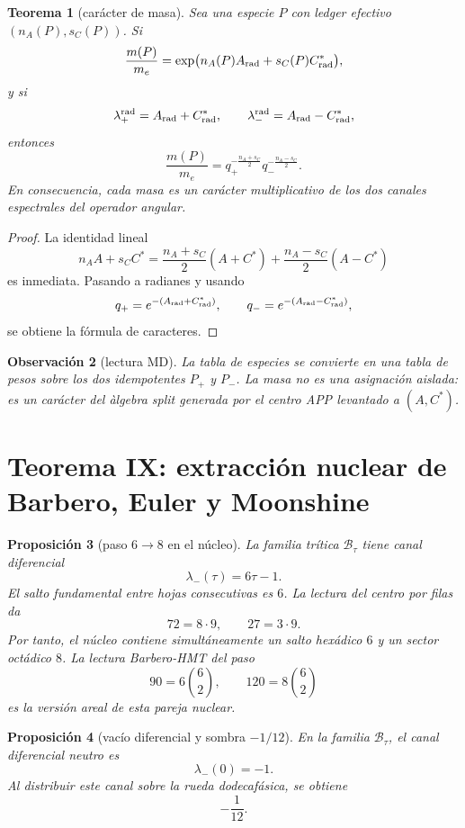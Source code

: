 \documentclass[11pt,a4paper]{article}
\newtheorem{teorema}{Teorema}
\newtheorem{proposicion}[teorema]{Proposici\'on}
\newtheorem{observacion}[teorema]{Observaci\'on}
\begin{document}
\begin{teorema}[car\'acter de masa]
Sea una especie \(P\) con ledger efectivo \((n_A(P),s_C(P))\). Si
\[
\frac{m(P)}{m_e}=\exp\bigl(n_A(P)A_{\rm rad}+s_C(P)C^\ast_{\rm rad}\bigr),
\]
y si
\[
\lambda_+^{\rm rad}=A_{\rm rad}+C^\ast_{\rm rad},
\qquad
\lambda_-^{\rm rad}=A_{\rm rad}-C^\ast_{\rm rad},
\]
entonces
\[
\boxed{
\frac{m(P)}{m_e}
= q_+^{-\frac{n_A+s_C}{2}}
q_-^{-\frac{n_A-s_C}{2}}.}
\]
En consecuencia, cada masa es un car\'acter multiplicativo de los dos canales espectrales del operador angular.
\end{teorema}

\begin{proof}
La identidad lineal
\[
n_AA+s_CC^\ast=\frac{n_A+s_C}{2}(A+C^\ast)+\frac{n_A-s_C}{2}(A-C^\ast)
\]
es inmediata. Pasando a radianes y usando
\[
q_+=e^{-(A_{\rm rad}+C^\ast_{\rm rad})},
\qquad
q_-=e^{-(A_{\rm rad}-C^\ast_{\rm rad})},
\]
se obtiene la f\'ormula de caracteres.
\end{proof}

\begin{observacion}[lectura MD]
La tabla de especies se convierte en una tabla de pesos sobre los dos idempotentes \(P_+\) y \(P_-\). La masa no es una asignaci\'on aislada: es un car\'acter del \`algebra split generada por el centro APP levantado a \((A,C^\ast)\).
\end{observacion}

\section{Teorema IX: extracci\'on nuclear de Barbero, Euler y Moonshine}

\begin{proposicion}[paso \(6\to8\) en el n\'ucleo]
La familia tr\'itica \(\mathcal B_\tau\) tiene canal diferencial
\[
\lambda_-(\tau)=6\tau-1.
\]
El salto fundamental entre hojas consecutivas es \(6\). La lectura del centro por filas da
\[
72=8\cdot9,
\qquad
27=3\cdot9.
\]
Por tanto, el n\'ucleo contiene simult\'aneamente un salto hex\'adico \(6\) y un sector oct\'adico \(8\). La lectura Barbero-HMT del paso
\[
90=6\binom62,
\qquad
120=8\binom62
\]
es la versi\'on areal de esta pareja nuclear.
\end{proposicion}

\begin{proposicion}[vac\'io diferencial y sombra \(-1/12\)]
En la familia \(\mathcal B_\tau\), el canal diferencial neutro es
\[
\lambda_-(0)=-1.
\]
Al distribuir este canal sobre la rueda dodecaf\'asica, se obtiene
\[
\boxed{-\frac1{12}.}
\]
\end{proposicion}
\end{document}
